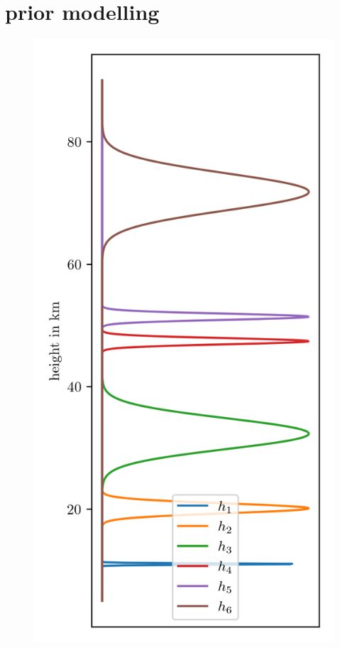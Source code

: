 \chapter{prior modelling}

\begin{figure}[ht!]
	\centering
	
	\caption[]{}
	\label{fig:TruePressFunc}
\end{figure}


\begin{figure}[ht!]
	\centering
	
	\caption[]{}
	\label{fig:TrueTempFunc}
\end{figure}

\begin{figure}[ht!]
	\centering
	\includegraphics{HeightPriors.png}
	\caption[]{}
	\label{fig:HeightPriors}
\end{figure}


